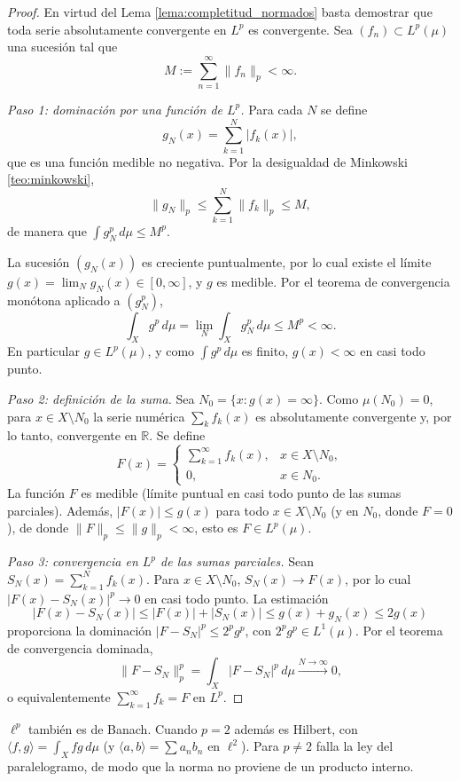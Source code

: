 \documentclass[11pt, a4paper]{article}
\begin{document}
\begin{proof}
En virtud del Lema \ref{lema:completitud_normados} basta demostrar que toda serie absolutamente convergente en $L^p$ es
convergente. Sea $(f_n) \subset L^p(\mu)$ una sucesión tal que
$$ M := \sum_{n=1}^{\infty} \|f_n\|_p < \infty. $$

\textit{Paso 1: dominación por una función de $L^p$.} Para cada $N$ se define
$$ g_N(x) = \sum_{k=1}^{N} |f_k(x)|, $$
que es una función medible no negativa. Por la desigualdad de Minkowski \ref{teo:minkowski},
$$ \|g_N\|_p \le \sum_{k=1}^N \|f_k\|_p \le M, $$
de manera que $\int g_N^p \, d\mu \le M^p$.

La sucesión $(g_N(x))$ es creciente puntualmente, por lo cual existe el límite
$g(x) = \lim_N g_N(x) \in [0, \infty]$, y $g$ es medible. Por el teorema de convergencia monótona
aplicado a $(g_N^p)$,
$$ \int_X g^p \, d\mu = \lim_N \int_X g_N^p \, d\mu \le M^p < \infty. $$
En particular $g \in L^p(\mu)$, y como $\int g^p \, d\mu$ es finito, $g(x) < \infty$ en casi todo
punto.

\textit{Paso 2: definición de la suma.} Sea $N_0 = \{x : g(x) = \infty\}$. Como $\mu(N_0) = 0$,
para
$x \in X \setminus N_0$ la serie numérica $\sum_k f_k(x)$ es absolutamente convergente y, por lo
tanto, convergente en $\mathbb{R}$. Se define
$$ F(x) = \begin{cases} \displaystyle\sum_{k=1}^{\infty} f_k(x), & x \in X \setminus N_0, \\
0, & x \in N_0. \end{cases} $$
La función $F$ es medible (límite puntual en casi todo punto de las sumas parciales). Además,
$|F(x)| \le g(x)$ para todo $x \in X \setminus N_0$ (y en $N_0$, donde $F = 0$), de donde
$\|F\|_p \le \|g\|_p < \infty$, esto es $F \in L^p(\mu)$.

\textit{Paso 3: convergencia en $L^p$ de las sumas parciales.} Sean $S_N(x) = \sum_{k=1}^N f_k(x)$.
Para $x \in X \setminus N_0$, $S_N(x) \to F(x)$, por lo cual $|F(x) - S_N(x)|^p \to 0$ en casi todo
punto. La estimación
$$ |F(x) - S_N(x)| \le |F(x)| + |S_N(x)| \le g(x) + g_N(x) \le 2 g(x) $$
proporciona la dominación $|F - S_N|^p \le 2^p g^p$, con $2^p g^p \in L^1(\mu)$. Por el teorema
de convergencia dominada,
$$ \|F - S_N\|_p^p = \int_X |F - S_N|^p \, d\mu \xrightarrow{N \to \infty} 0, $$
o equivalentemente $\sum_{k=1}^{\infty} f_k = F$ en $L^p$.
\end{proof}

\obs $\ell^p$ también es de Banach. Cuando $p = 2$ además es Hilbert, con
$\langle f, g \rangle = \int_X fg \, d\mu$ (y $\langle a, b \rangle = \sum a_n b_n$ en $\ell^2$).
Para $p \ne 2$ falla la ley del paralelogramo, de modo que la norma no proviene de un producto
interno.
\end{document}
